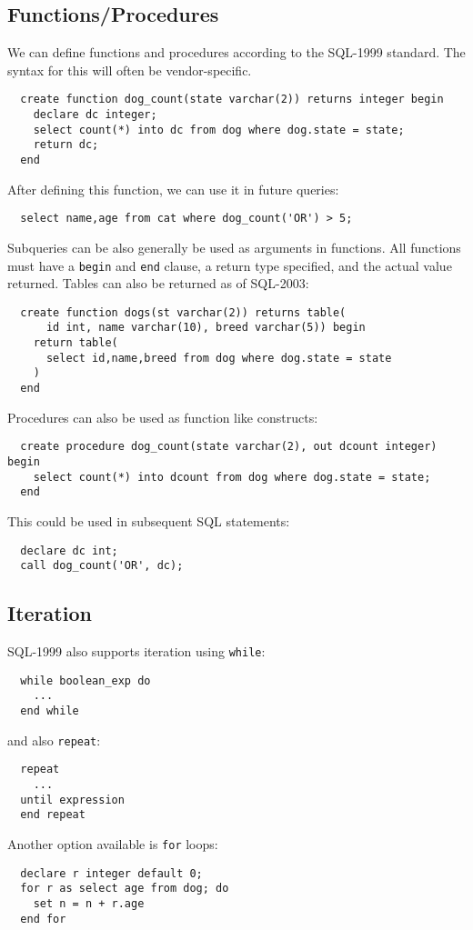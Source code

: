 \documentclass{math}
\begin{document}
\subsection*{Functions/Procedures}
We can define functions and procedures according to the SQL-1999 standard.
The syntax for this will often be vendor-specific.
\begin{lstlisting}
  create function dog_count(state varchar(2)) returns integer begin
    declare dc integer;
    select count(*) into dc from dog where dog.state = state;
    return dc;
  end
\end{lstlisting}
After defining this function, we can use it in future queries:
\begin{lstlisting}
  select name,age from cat where dog_count('OR') > 5;
\end{lstlisting}
Subqueries can be also generally be used as arguments in functions. All
functions must have a \texttt{begin} and \texttt{end} clause, a return type
specified, and the actual value returned. Tables can also be returned as of
SQL-2003:
\begin{lstlisting}
  create function dogs(st varchar(2)) returns table(
      id int, name varchar(10), breed varchar(5)) begin
    return table(
      select id,name,breed from dog where dog.state = state
    )
  end
\end{lstlisting}
Procedures can also be used as function like constructs:
\begin{lstlisting}
  create procedure dog_count(state varchar(2), out dcount integer) begin
    select count(*) into dcount from dog where dog.state = state;
  end
\end{lstlisting}
This could be used in subsequent SQL statements:
\begin{lstlisting}
  declare dc int;
  call dog_count('OR', dc);
\end{lstlisting}

\subsection*{Iteration}
SQL-1999 also supports iteration using \texttt{while}:
\begin{lstlisting}
  while boolean_exp do
    ...
  end while
\end{lstlisting}
and also \texttt{repeat}:
\begin{lstlisting}
  repeat
    ...
  until expression
  end repeat
\end{lstlisting}
Another option available is \texttt{for} loops:
\begin{lstlisting}
  declare r integer default 0;
  for r as select age from dog; do
    set n = n + r.age
  end for
\end{lstlisting}
\end{document}

